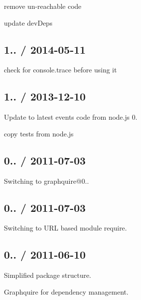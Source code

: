 \begin{DoxyItemize}
\item remove un-\/reachable code
\item update dev\+Deps
\end{DoxyItemize}

\subsection*{1.. / 2014-\/05-\/11}


\begin{DoxyItemize}
\item check for console.\+trace before using it
\end{DoxyItemize}

\subsection*{1.. / 2013-\/12-\/10}


\begin{DoxyItemize}
\item Update to latest events code from node.\+js 0.
\item copy tests from node.\+js
\end{DoxyItemize}

\subsection*{0.. / 2011-\/07-\/03}


\begin{DoxyItemize}
\item Switching to graphquire@0..
\end{DoxyItemize}

\subsection*{0.. / 2011-\/07-\/03}


\begin{DoxyItemize}
\item Switching to U\+RL based module require.
\end{DoxyItemize}

\subsection*{0.. / 2011-\/06-\/10}


\begin{DoxyItemize}
\item Simplified package structure.
\item Graphquire for dependency management.
\end{DoxyItemize}

